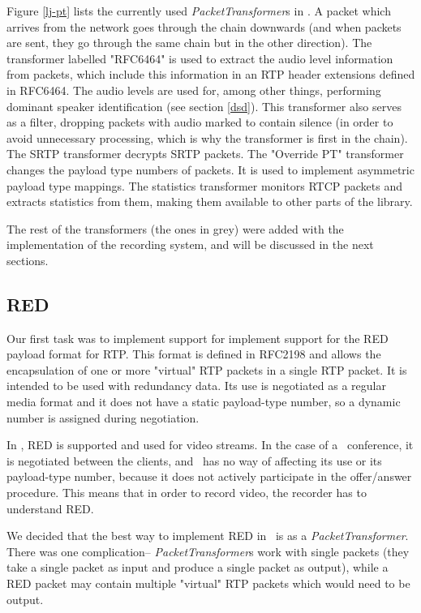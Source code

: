 \documentclass[twoside,openright,a4paper,12pt,english]{article}
\begin{document}
Figure \ref{lj-pt} lists the currently used \emph{PacketTransformer}s in \lj. A
packet which arrives from the network goes through the chain downwards (and
when packets are sent, they go through the same chain but in the other
direction). The transformer labelled "RFC6464" is used to extract the
audio level information from packets, which include this information in
an RTP header extensions defined in RFC6464\cite{rfc6464}. The audio
levels are used for, among other things, performing dominant speaker
identification (see section \ref{dsd}). This transformer also serves
as a filter, dropping packets with audio marked to contain silence (in order to
avoid unnecessary processing, which is why the transformer is first in the
chain). The SRTP transformer decrypts SRTP packets. The
"Override PT" transformer changes the payload type numbers of packets. It is
used to implement asymmetric payload type mappings. The statistics transformer
monitors RTCP packets and extracts statistics from them, making them available
to other parts of the library.

The rest of the transformers (the ones in grey) were added with the
implementation of the recording system, and will be discussed in the next
sections.



\subsection{RED}
\label{red}
Our first task was to implement support for implement support for the RED 
payload format for RTP. This format is defined in
RFC2198\cite{red} and allows the encapsulation of
one or more "virtual" RTP packets in a single RTP packet. It is intended to be
used with redundancy data. Its use is negotiated as a regular media format and
it does not have a static payload-type number, so a dynamic number is assigned
during negotiation.

In \wrtc, RED is supported and used for video streams. In the case of a \jm\
conference, it is negotiated between the clients, and \jvb\ has no way of
affecting its use or its payload-type number, because it does not actively
participate in the offer/answer procedure. This means that in order to record
video, the recorder has to understand RED.

\smallskip
We decided that the best way to implement RED in \lj\ is as
a \emph{PacketTransformer}. There was one complication--
\emph{PacketTransformer}s work with single packets (they take a single packet
as input and produce a single packet as output), while a RED packet may contain
multiple "virtual" RTP packets which would need to be output.
\end{document}
